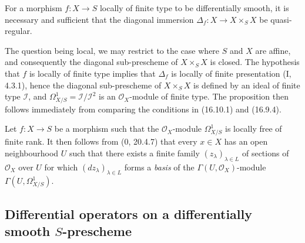 \begin{proposition}[16.10.5]
\label{IV.16.10.5}
For a morphism $f:X\to S$ locally of finite type to be
differentially smooth, it is necessary and sufficient that the diagonal
immersion $\Delta_f:X\to X\times_S X$ be quasi-regular.
\end{proposition}


The question being local, we may restrict to the case where $S$ and $X$ are
affine, and consequently the diagonal sub-prescheme of $X\times_S X$ is
closed. The hypothesis that $f$ is locally of finite type implies that
$\Delta_f$ is locally of finite presentation (I, 4.3.1), hence the diagonal
sub-prescheme of $X\times_S X$ is defined by an ideal of finite type
$\mathscr{I}$, and $\Omega_{X/S}^1=\mathscr{I}/\mathscr{I}^2$ is an
$\mathcal{O}_X$-module of finite type. The proposition then follows
immediately from comparing the conditions in (16.10.1) and (16.9.4).

\begin{remark}[16.10.6]
\label{IV.16.10.6}
Let $f:X\to S$ be a morphism such that the $\mathcal{O}_X$-module
$\Omega_{X/S}^1$ is locally free of finite rank. It then follows from
(0, 20.4.7) that every $x\in X$ has an open neighbourhood $U$ such that there
exists a finite family $(z_\lambda)_{\lambda\in L}$ of sections of
$\mathcal{O}_X$ over $U$ for which $(dz_\lambda)_{\lambda\in L}$
forms a \emph{basis} of the $\Gamma(U,\mathcal{O}_X)$-module
$\Gamma(U,\Omega_{X/S}^1)$.
\end{remark}

\subsection{\texorpdfstring{Differential operators on a differentially smooth
$S$-prescheme}{Differential operators on a differentially smooth S-prescheme}}

